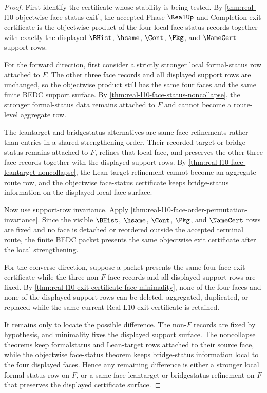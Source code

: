 \begin{proof}
First identify the certificate whose stability is being tested. By \autoref{thm:real-l10-objectwise-face-status-exit}, the accepted Phase $\RealUp$ and Completion exit certificate is the objectwise product of the four local face-status records together with exactly the displayed $\BHist$, $\hsame$, $\Cont$, $\Pkg$, and $\NameCert$ support rows.

For the forward direction, first consider a strictly stronger local formal-status row attached to $F$. The other three face records and all displayed support rows are unchanged, so the objectwise product still has the same four faces and the same finite BEDC support surface. By \autoref{thm:real-l10-face-status-noncollapse}, the stronger formal-status data remains attached to $F$ and cannot become a route-level aggregate row.

The leantarget and bridgestatus alternatives are same-face refinements rather than entries in a shared strengthening order. Their recorded target or bridge status remains attached to $F$, refines that local face, and preserves the other three face records together with the displayed support rows. By \autoref{thm:real-l10-face-leantarget-noncollapse}, the Lean-target refinement cannot become an aggregate route row, and the objectwise face-status certificate keeps bridge-status information on the displayed local face surface.

Now use support-row invariance. Apply \autoref{thm:real-l10-face-order-permutation-invariance}. Since the visible $\BHist$, $\hsame$, $\Cont$, $\Pkg$, and $\NameCert$ rows are fixed and no face is detached or reordered outside the accepted terminal route, the finite BEDC packet presents the same objectwise exit certificate after the local strengthening.

For the converse direction, suppose a packet presents the same four-face exit certificate while the three non-$F$ face records and all displayed support rows are fixed. By \autoref{thm:real-l10-exit-certificate-face-minimality}, none of the four faces and none of the displayed support rows can be deleted, aggregated, duplicated, or replaced while the same current Real L10 exit certificate is retained.

It remains only to locate the possible difference. The non-$F$ records are fixed by hypothesis, and minimality fixes the displayed support surface. The noncollapse theorems keep formalstatus and Lean-target rows attached to their source face, while the objectwise face-status theorem keeps bridge-status information local to the four displayed faces. Hence any remaining difference is either a stronger local formal-status row on $F$, or a same-face leantarget or bridgestatus refinement on $F$ that preserves the displayed certificate surface.


\end{proof}

